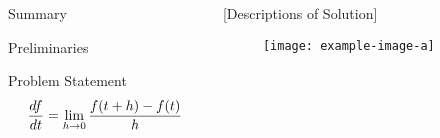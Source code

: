 \documentclass[final]{beamer}
\title{\pwintz@title}%
\author{%
   \ifcsdef{pwintz@author1}{%
        \csname pwintz@author1\endcsname%
        \textsuperscript{\csname pwintz@authorInstitute1\endcsname}%
        \ifcsdef{pwintz@authorEmail1}{ (\csname pwintz@authorEmail1\endcsname)}{}%
    }{}%
    \ifcsdef{pwintz@author2}{, \ifcsdef{pwintz@author3}{}{and }}{}%
    \ifcsdef{pwintz@author2}{%
        \csname pwintz@author2\endcsname%
        \textsuperscript{\csname pwintz@authorInstitute2\endcsname}%
    }{}%
    \ifcsdef{pwintz@author3}{, \ifcsdef{pwintz@author4}{}{and }}{}%
    \ifcsdef{pwintz@author3}{%
        \csname pwintz@author3\endcsname%
        \textsuperscript{\csname pwintz@authorInstitute3\endcsname}%
    }{}%
    \ifcsdef{pwintz@author4}{, \ifcsdef{pwintz@author5}{}{and }}{}%
    \ifcsdef{pwintz@author4}{%
        \csname pwintz@author4\endcsname%
        \textsuperscript{\csname pwintz@authorInstitute4\endcsname}%
    }{}
}
\institute{ %
    \ifcsdef{pwintz@institute1}{%
        \textsuperscript{1}\csname pwintz@institute1\endcsname%
    }{}%
    \ifcsdef{pwintz@institute2}{%
       ; \textsuperscript{2}\csname pwintz@institute2\endcsname%
    }{}%
    \ifcsdef{pwintz@institute3}{%
       ; \textsuperscript{3}\csname pwintz@institute3\endcsname%
    }{}%
    \ifcsdef{pwintz@institute3}{; }{}%
    \ifcsdef{pwintz@institute4}{%
       ; \textsuperscript{4}\csname pwintz@institute3\endcsname%
    }{}%
}
\newlength{\colspace}
\newlength{\colspaceinner}
\newlength{\colspaceouter}
\newlength{\onecolwid}
\begin{document}

\setlength{\belowcaptionskip}{2ex} %
\setlength\belowdisplayshortskip{2ex} %

\begin{frame}[t] %

\begin{columns}[t] %

\hspace{\colspaceouter} %
\begin{column}{\onecolwid} %


\begin{block}{Summary}
    \lipsum[1]
\end{block}


\begin{block}{Preliminaries}
    \lipsum[2]
\end{block}

\begin{block}{Problem Statement}
    \lipsum[2][1-2]
    $$ \ddt[f]=\lim_{h \to 0} \frac{f(t+h)-f(t)}{h} $$
    \lipsum[3-5]
\end{block}

\end{column} %
\hspace{\colspaceinner}
\begin{column}{\onecolwid}%

\begin{block}{[Descriptions of Solution]}
    \lipsum[6-8]
    \begin{figure}[ht]
        \centering
        \texttt{[image: example-image-a]}
    \end{figure}
    \lipsum[9][1-3]
\end{block}


\end{column}
\end{columns}
\end{frame}
\end{document}
